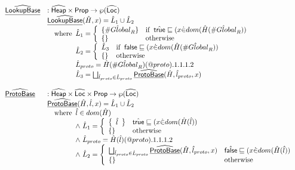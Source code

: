 \documentclass{article}
\makeatletter
\newcommand{\SF}[1]{\mbox{\textsf{#1}}}
\newcommand{\wherec}[1]{{\rm where}\begin{array}[t]{l}#1\end{array}}
\newcommand{\ifc}[1]{{\rm if}\begin{array}[t]{l}#1\end{array}}
\newcommand{\owc}{{\rm otherwise}}
\newcommand{\Prop}{\SF{Prop}}
\newcommand{\abs}[1]{\widehat{\SF{#1}}}
\newcommand{\aHeap}{\abs{Heap}}
\newcommand{\aLoc}{\abs{Loc}}
\newcommand{\set}[1]{\left\{\begin{array}{l}#1\end{array}\right\}}
\newcommand{\powerset}[1]{\wp(#1)}
\newcommand{\ahf}[1]{\widehat{\underline{\sf #1}}}
\newcommand{\varprop}[1]{@#1}
\newcommand{\avarloc}[1]{\hat{\##1}}
\newcommand{\vfalse}{\SF{false}}
\newcommand{\atrue}{\hat{\SF{true}}}
\newcommand{\afalse}{\hat{\SF{false}}}
\makeatother
\begin{document}
\[\begin{array}{ll}
\\
\\
\ahf{LookupBase} & : \aHeap \times \Prop \rightarrow \powerset{\aLoc}\\
&
  \ahf{LookupBase}(\hat{H},x)
   = \hat{L}_1\cup\hat{L}_2\\
& \quad\wherec{
  \hat{L}_1 = \left\{
    \begin{array}{ll}
      \{\avarloc{Global}_R\}
      & \ifc{\atrue\sqsubseteq(x \dot{\in} dom(\hat{H}(\avarloc{Global}_R))} \\
      \{\}
      & \owc \\
    \end{array}\right. \\
  \hat{L}_2 = \left\{
    \begin{array}{ll}
      \hat{L}_3
      & \ifc{\vfalse\sqsubseteq(x \dot{\in} dom(\hat{H}(\avarloc{Global}_R))}\\
      \{\}
      & \owc \\
    \end{array}\right. \\
  \hat{L}_{proto} = \hat{H}(\avarloc{Global}_R)(\varprop{proto}).1.1.1.2\\
  \hat{L}_3 = 
    \bigsqcup_{\hat{l}_{proto}\in\hat{L}_{proto}}
    \ahf{ProtoBase}(\hat{H}, \hat{l}_{proto}, x)\\
}\\
\\

\ahf{ProtoBase} & : \aHeap \times \aLoc \times \Prop \rightarrow \powerset{\aLoc}\\
  & \ahf{ProtoBase}(\hat{H},\hat{l},x)
    = \hat{L}_1\cup\hat{L}_2\\
  & \quad\wherec{
      \hat{l} \in dom(\hat{H})\\
      \land\ \hat{L}_1 =
        \left\{
          \begin{array}{ll}
            \set{\hat{l}} & \atrue\sqsubseteq(x \dot{\in} dom(\hat{H}(\hat{l}))\\
            \set{} & \owc \\
          \end{array}
        \right.\\
        \land\ \hat{L}_{proto} = \hat{H}(\hat{l})(\varprop{proto}).1.1.1.2\\
      \land\ \hat{L}_2 =
        \left\{
          \begin{array}{ll}
            \bigsqcup_{\hat{l}_{proto}\in\hat{L}_{proto}}\ahf{ProtoBase}(\hat{H},\hat{l}_{proto},x)
            & \afalse\sqsubseteq(x \dot{\in} dom(\hat{H}(\hat{l}))\\
            \set{} & \owc \\
          \end{array}
        \right.\\
        
}
\end{array}\]
\end{document}
